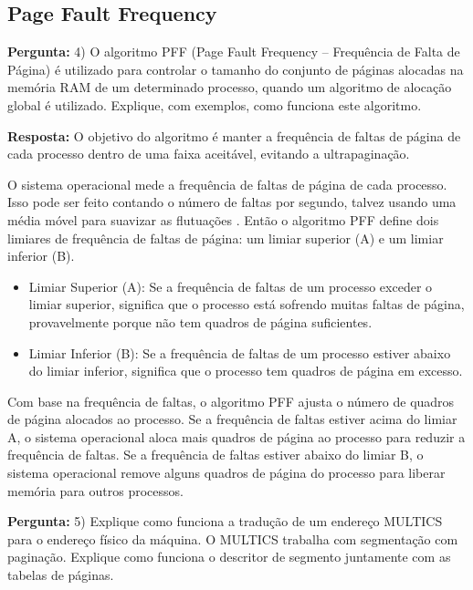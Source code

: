 \documentclass{article}
\begin{document}
\subsection{Page Fault Frequency}

\textbf{Pergunta:} 4) O algoritmo PFF (Page Fault Frequency – Frequência de Falta de Página) é utilizado para controlar o tamanho do conjunto de páginas alocadas na memória RAM de um determinado processo, quando um algoritmo de alocação global é utilizado. Explique, com exemplos, como funciona este algoritmo.  \newline

\textbf{Resposta:} O objetivo do algoritmo é manter a frequência de faltas de página de cada processo dentro de uma faixa aceitável, evitando a ultrapaginação.

O sistema operacional mede a frequência de faltas de página de cada processo. Isso pode ser feito contando o número de faltas por segundo, talvez usando uma média móvel para suavizar as flutuações \textcite[p. 155]{tanenbaum2021}. Então o algoritmo PFF define dois limiares de frequência de faltas de página: um limiar superior (A) e um limiar inferior (B). 
  
\begin{itemize}
  \item Limiar Superior (A): Se a frequência de faltas de um processo exceder o limiar superior, significa que o processo está sofrendo muitas faltas de página, provavelmente porque não tem quadros de página suficientes.
  \item Limiar Inferior (B): Se a frequência de faltas de um processo estiver abaixo do limiar inferior, significa que o processo tem quadros de página em excesso.
\end{itemize}

Com base na frequência de faltas, o algoritmo PFF ajusta o número de quadros de página alocados ao processo. Se a frequência de faltas estiver acima do limiar A, o sistema operacional aloca mais quadros de página ao processo para reduzir a frequência de faltas. Se a frequência de faltas estiver abaixo do limiar B, o sistema operacional remove alguns quadros de página do processo para liberar memória para outros processos.

\textbf{Pergunta:} 5) Explique como funciona a tradução de um endereço MULTICS para o endereço físico da máquina. O MULTICS trabalha com segmentação com paginação. Explique como funciona o descritor de segmento juntamente com as tabelas de páginas.  \newline
\end{document}
